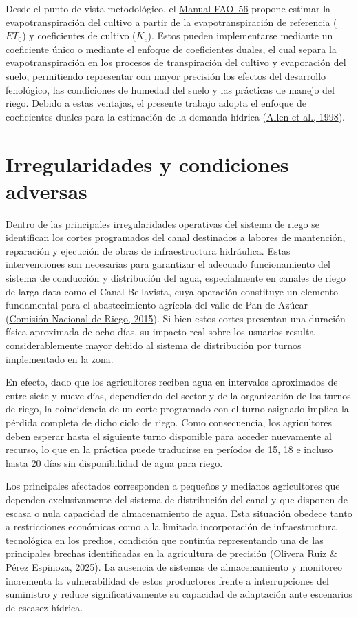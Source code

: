 \documentclass[12pt]{report}
\newcommand{\citeref}[2]{\hyperlink{ref:#1}{#2}}
\begin{document}
Desde el punto de vista metodológico, el \citeref{allen1998}{Manual FAO~56} propone estimar la evapotranspiración del cultivo a partir de la evapotranspiración de referencia ($ET_0$) y coeficientes de cultivo ($K_c$). Estos pueden implementarse mediante un coeficiente único o mediante el enfoque de coeficientes duales, el cual separa la evapotranspiración en los procesos de transpiración del cultivo y evaporación del suelo, permitiendo representar con mayor precisión los efectos del desarrollo fenológico, las condiciones de humedad del suelo y las prácticas de manejo del riego. Debido a estas ventajas, el presente trabajo adopta el enfoque de coeficientes duales para la estimación de la demanda hídrica (\citeref{allen1998}{Allen et al., 1998}). 

\section{Irregularidades y condiciones adversas}

Dentro de las principales irregularidades operativas del sistema de riego se identifican los cortes programados del canal destinados a labores de mantención, reparación y ejecución de obras de infraestructura hidráulica. Estas intervenciones son necesarias para garantizar el adecuado funcionamiento del sistema de conducción y distribución del agua, especialmente en canales de riego de larga data como el Canal Bellavista, cuya operación constituye un elemento fundamental para el abastecimiento agrícola del valle de Pan de Azúcar (\citeref{cnr2015}{Comisión Nacional de Riego, 2015}). Si bien estos cortes presentan una duración física aproximada de ocho días, su impacto real sobre los usuarios resulta considerablemente mayor debido al sistema de distribución por turnos implementado en la zona.

En efecto, dado que los agricultores reciben agua en intervalos aproximados de entre siete y nueve días, dependiendo del sector y de la organización de los turnos de riego, la coincidencia de un corte programado con el turno asignado implica la pérdida completa de dicho ciclo de riego. Como consecuencia, los agricultores deben esperar hasta el siguiente turno disponible para acceder nuevamente al recurso, lo que en la práctica puede traducirse en períodos de 15, 18 e incluso hasta 20 días sin disponibilidad de agua para riego.

Los principales afectados corresponden a pequeños y medianos agricultores que dependen exclusivamente del sistema de distribución del canal y que disponen de escasa o nula capacidad de almacenamiento de agua. Esta situación obedece tanto a restricciones económicas como a la limitada incorporación de infraestructura tecnológica en los predios, condición que continúa representando una de las principales brechas identificadas en la agricultura de precisión (\citeref{olivera2025}{Olivera Ruiz \& Pérez Espinoza, 2025}). La ausencia de sistemas de almacenamiento y monitoreo incrementa la vulnerabilidad de estos productores frente a interrupciones del suministro y reduce significativamente su capacidad de adaptación ante escenarios de escasez hídrica.
\end{document}
